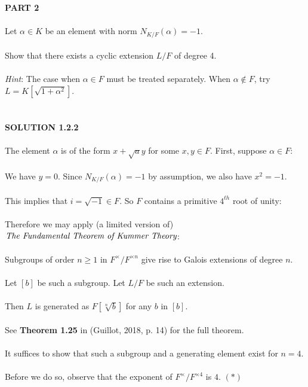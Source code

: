 \documentclass{article}
\begin{document}
\noindent \textbf{PART 2} \\\\
\indent Let $\alpha \in K$ be an element with norm $N_{K/F}(\alpha) = -1$. \\\\
\indent Show that there exists a cyclic extension $L/F$ of degree 4. \\\\
\indent \emph{Hint}: The case when $\alpha \in F$ must be treated separately. When $\alpha \notin F$, try $L = K[\sqrt{1+\alpha^2}]$. \\\\
\\
\textbf{SOLUTION 1.2.2} \\\\
\noindent The element $\alpha$ is of the form $x + \sqrt{a} y$ for some $x, y \in F$. First, suppose $\alpha \in F$: \\\\
\indent We have $y = 0$. Since $N_{K/F}(\alpha) = -1$ by assumption, we also have $x^2 = -1$. \\\\
\indent This implies that $i = \sqrt{-1} \in F$. So $F$ contains a primitive $4^{th}$ root of unity: \\\\
\indent Therefore we may apply (a limited version of) $\emph{The Fundamental Theorem of Kummer Theory}$: \\\\ 
\indent \indent Subgroups of order $n \geq 1$ in $F^\times/F^{\times n}$ give rise to Galois extensions of degree $n$. \\\\
\indent \indent Let $[b]$ be such a subgroup. Let $L/F$ be such an extension. \\\\
\indent \indent Then $L$ is generated as $F[\sqrt[n]{b}]$ for any $b$ in $[b]$. \\\\
\indent \indent See \textbf{Theorem 1.25} in (Guillot, 2018, p. 14) for the full theorem. \\\\
\indent It suffices to show that such a subgroup and a generating element exist for $n = 4$. \\\\
\indent Before we do so, observe that the exponent of $F^\times/F^{\times4}$ is $4$. $(\ast)$ \\\\
\end{document}
